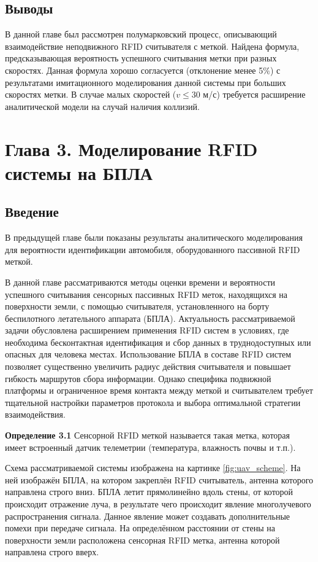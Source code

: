 \documentclass[12pt]{article}
\theoremstyle{definition}
\begin{document}
\subsection*{Выводы}

В данной главе был рассмотрен полумарковский процесс, описывающий взаимодействие неподвижного RFID считывателя с меткой. Найдена формула, предсказывающая вероятность успешного считывания метки при разных скоростях. Данная формула хорошо согласуется (отклонение менее 5$\%$) с результатами имитационного моделирования данной системы при больших скоростях метки. В случае малых скоростей ($v\leq30$ м/с) требуется расширение аналитической модели на случай наличия коллизий.

\pagebreak

\section{Глава 3. Моделирование RFID системы на БПЛА}
\label{sec:ch3}
\subsection{Введение}
\label{sec:ch31}

В предыдущей главе были показаны результаты аналитического моделирования для вероятности идентификации автомобиля, оборудованного пассивной RFID меткой.

В данной главе рассматриваются методы оценки времени и вероятности успешного считывания сенсорных пассивных RFID меток, находящихся на поверхности земли, с помощью считывателя, установленного на борту беспилотного летательного аппарата (БПЛА). Актуальность рассматриваемой задачи обусловлена расширением применения RFID систем в условиях, где необходима бесконтактная идентификация и сбор данных в труднодоступных или опасных для человека местах. Использование БПЛА в составе RFID систем позволяет существенно увеличить радиус действия считывателя и повышает гибкость маршрутов сбора информации. Однако специфика подвижной платформы и ограниченное время контакта между меткой и считывателем требует тщательной настройки параметров протокола и выбора оптимальной стратегии взаимодействия.

\textbf{Определение 3.1} Сенсорной RFID меткой называется такая метка, которая имеет встроенный датчик телеметрии (температура, влажность почвы и т.п.).

Схема рассматриваемой системы изображена на картинке \ref{fig:uav_scheme}. На ней изображён БПЛА, на котором закреплён RFID считыватель, антенна которого направлена строго вниз. БПЛА летит прямолинейно вдоль стены, от которой происходит отражение луча, в результате чего происходит явление многолучевого распространения сигнала. Данное явление может создавать дополнительные помехи при передаче сигнала. На определённом расстоянии от стены на поверхности земли расположена сенсорная RFID метка, антенна которой направлена строго вверх.
\end{document}
